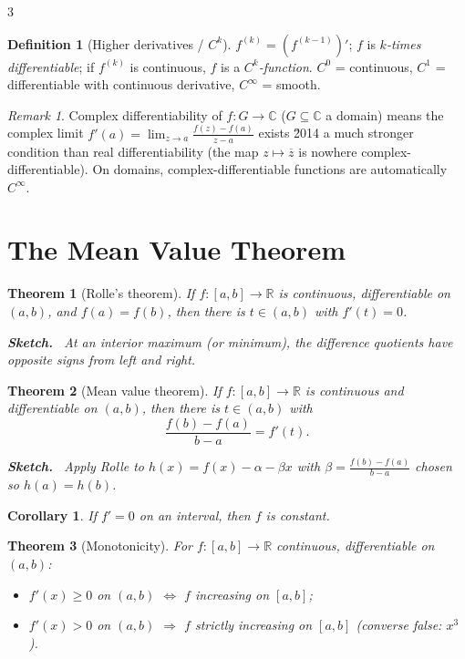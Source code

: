 \documentclass[10pt,a4paper,landscape]{article}
\theoremstyle{definition}
\newtheorem{defn}{Definition}[section]
\theoremstyle{plain}
\newtheorem{thm}{Theorem}[section]
\newtheorem{cor}{Corollary}[section]
\theoremstyle{remark}
\newtheorem{rem}{Remark}[section]
\newcommand{\R}{\mathbb{R}}
\newcommand{\C}{\mathbb{C}}
\newcommand{\oo}{\infty}
\newenvironment{proofsketch}{%
  \par\small\color{exgray}\textbf{Sketch.}\ }%
  {\par}
\begin{document}
\begin{multicols*}{3}
\begin{defn}[Higher derivatives / $C^k$]
$f^{(k)} = (f^{(k-1)})'$; $f$ is \emph{$k$-times differentiable}; if $f^{(k)}$ is continuous, $f$ is a \emph{$C^k$-function}. $C^0$ = continuous, $C^1$ = differentiable with continuous derivative, $C^{\oo}$ = smooth.
\end{defn}

\begin{rem}
Complex differentiability of $f: G \to \C$ ($G \subseteq \C$ a domain) means the complex limit $f'(a) = \lim_{z \to a} \frac{f(z)-f(a)}{z-a}$ exists \u2014 a much stronger condition than real differentiability (the map $z \mapsto \overline{z}$ is nowhere complex-differentiable). On domains, complex-differentiable functions are automatically $C^{\oo}$.
\end{rem}

\section{The Mean Value Theorem}

\begin{thm}[Rolle's theorem]
If $f: [a,b] \to \R$ is continuous, differentiable on $(a,b)$, and $f(a) = f(b)$, then there is $t \in (a,b)$ with $f'(t) = 0$.
\begin{proofsketch}
At an interior maximum (or minimum), the difference quotients have opposite signs from left and right.
\end{proofsketch}
\end{thm}

\begin{thm}[Mean value theorem]
If $f: [a,b] \to \R$ is continuous and differentiable on $(a,b)$, then there is $t \in (a,b)$ with
\[
\frac{f(b) - f(a)}{b - a} = f'(t).
\]
\begin{proofsketch}
Apply Rolle to $h(x) = f(x) - \alpha - \beta x$ with $\beta = \frac{f(b)-f(a)}{b-a}$ chosen so $h(a) = h(b)$.
\end{proofsketch}
\end{thm}

\begin{cor}
If $f' = 0$ on an interval, then $f$ is constant.
\end{cor}

\begin{thm}[Monotonicity]
For $f: [a,b] \to \R$ continuous, differentiable on $(a,b)$:
\begin{itemize}
\item $f'(x) \ge 0$ on $(a,b)$ $\Leftrightarrow$ $f$ increasing on $[a,b]$;
\item $f'(x) > 0$ on $(a,b)$ $\Rightarrow$ $f$ strictly increasing on $[a,b]$ (converse false: $x^3$).
\end{itemize}
\end{thm}


\end{multicols*}
\end{document}
